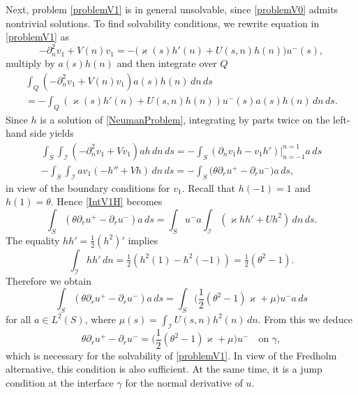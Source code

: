 \documentclass[reqno]{amsart}
\theoremstyle{plain}
\numberwithin{equation}{section}
\renewcommand{\kappa}{\varkappa}
\newcommand{\cI}{\mathcal{I}}
\newcommand{\pte}{\partial_n}
\begin{document}
Next, problem \eqref{problemV1} is in general unsolvable, since \eqref{problemV0} admits  nontrivial solutions.  To find solvabi\-li\-ty conditions, we rewrite  equation in \eqref{problemV1} as
\begin{equation}\label{eqnV1Expand}
  -\pte^2 v_1+V(n)v_1=-\big(\kappa(s)h'(n)+U(s,n)h(n)\big)u^-(s),
\end{equation}
multiply  by $a(s)h(n)$  and then integrate over $Q$
\begin{multline}\label{IntV1H}
\int_{Q}\left(-\pte^2 v_1+V(n)v_1\right)a(s)h(n)\,dn\,ds
\\
=
-\int_{Q}(\kappa(s)h'(n)+U(s,n)h(n))u^-(s)a(s)h(n)\, dn\,ds.
\end{multline}
Since $h$ is a solution of \eqref{NeumanProblem}, integrating by parts twice on the left-hand side yields
\begin{multline*}
\int_{S} \int_{\cI}\left(-\pte^2 v_1+Vv_1\right)a h\,dn \,ds
=-\int_{S}( \partial_n v_1 h-v_1 h')\big|_{n=-1}^{n=1}a\,ds\\-
\int_{S} \int_{\cI} a v_1\left(-h''+Vh\right)\,dn\,ds
=-\int_{S}\big(\theta\partial_r u^+-\partial_r u^-\big) a\,ds,
\end{multline*}
in view of the boundary conditions for $v_1$.
Recall that $h(-1)=1$ and $h(1)=\theta$.
Hence \eqref{IntV1H} becomes
\begin{equation*}
\int_{S}\left(\theta\partial_r u^+-\partial_r u^-\right)a\,ds
=\int_{S} u^-a\int_{\cI}\left(\kappa hh'+U h^2\right)\,dn\,ds.
\end{equation*}
The equality  $hh'=\frac12 (h^2)'$ implies
\begin{equation}\label{IntHHpr}
\int_{\cI}hh'\,dn=\tfrac12 (h^2(1)-h^2(-1))=\tfrac{1}{2 }(\theta^2-1).
\end{equation}
 Therefore we obtain
\begin{equation*}
\int_{S}\left(\theta\partial_r u^+-\partial_r u^-\right)a\,ds
=\int_{S}\big(\textstyle\frac{1}{2}(\theta^2-1)\kappa+\mu \big)u^-a\,ds
\end{equation*}
for all  $a\in L^2(S)$, where $\mu(s)=\int_{\cI} U(s,n)h^2(n)\, dn$.
From this we deduce
\begin{equation*}
  \theta\partial_r u^+-\partial_r u^-
=\big(\textstyle\frac{1}{2}(\theta^2-1)\kappa+\mu \big) u^-\quad\text {on }\gamma,
\end{equation*}
which is necessary for the solvability of \eqref{problemV1}.
In view of the Fredholm alternative, this condition is also  sufficient. At the same time, it is a jump condition at the interface $\gamma$ for the normal derivative of $u$.
\end{document}
